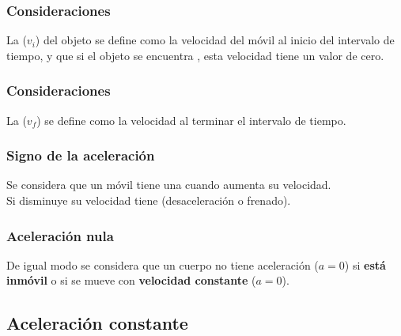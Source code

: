\documentclass[14pt]{beamer}
\begin{document}
\begin{frame}
\frametitle{Consideraciones}
La  ($v_{i}$) del objeto se define como la velocidad del móvil al inicio del intervalo de tiempo, \pause y que si el objeto se encuentra , esta velocidad tiene un valor de cero.
\end{frame}
\begin{frame}
\frametitle{Consideraciones}
La  ($v_{f}$) se define como la velocidad al terminar el intervalo de tiempo.
\end{frame}
\begin{frame}
\frametitle{Signo de la aceleración}
Se considera que un móvil tiene una  cuando aumenta su velocidad.
\\
\bigskip
\pause
Si disminuye su velocidad tiene  (desaceleración o frenado).
\end{frame}
\begin{frame}
\frametitle{Aceleración nula}
De igual modo se considera que un cuerpo no tiene aceleración ($a = 0$) si \textbf{está inmóvil} \pause o si se mueve con \textbf{velocidad constante} ($a = 0$).
\end{frame}

\subsection{Aceleración constante}
\end{document}
